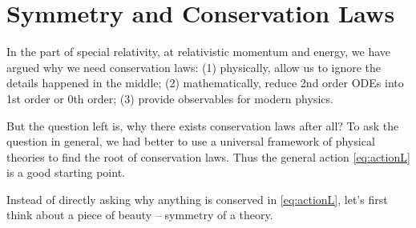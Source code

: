 \section{Symmetry and Conservation Laws}

In the part of special relativity, at relativistic momentum and energy, we have argued why we need conservation laws: (1) physically, allow us to ignore the details happened in the middle; (2) mathematically, reduce 2nd order ODEs into 1st order or 0th order; (3) provide observables for modern physics. 

But the question left is, why there exists conservation laws after all? To ask the question in general, we had better to use a universal framework of physical theories to find the root of conservation laws. Thus the general action \eqref{eq:actionL} is a good starting point.

Instead of directly asking why anything is conserved in \eqref{eq:actionL}, let's first think about a piece of beauty -- symmetry of a theory.

